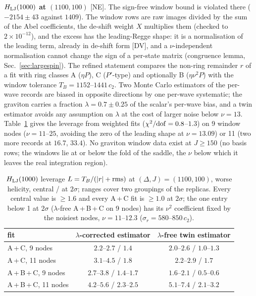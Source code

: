 \documentclass[aps,prl,onecolumn,superscriptaddress,nofootinbib]{revtex4-2}
\begin{document}
\textbf{$H_{\rm LJ}(1000)$ at $(1100,100)$} [NE]. The sign-free window bound is violated there ($-2154\pm43$ against
$1409$). The window rows are raw images divided by the sum of the Abel coefficients, the de-shift weight $X$
multiplies them (checked to $2\times10^{-12}$), and the excess has the leading-Regge shape: it is a normalisation of
the leading term, already in de-shift form [DV], and a $\nu$-independent normalisation cannot change the sign of a
per-state matrix (congruence lemma, Sec.~\ref{sec:largespin}). The refined statement compares the non-ring
remainder $r$ of a fit with ring classes A ($\eta P$), C ($P'$-type) and optionally B ($\eta\nu^2P$) with the window
tolerance $T_B=1152$--$1441\,c_2$. Two Monte Carlo estimators of the per-wave records are biased in
opposite directions by one per-wave systematic; the graviton carries a fraction $\lambda=0.7\pm0.25$ of the scalar's
per-wave bias, and a twin estimator avoids any assumption on $\lambda$ at the cost of larger noise below $\nu=13$.
Table~\ref{tab:dircv} gives the leverage from weighted fits ($\chi^2/{\rm dof}=0.8$--$1.3$) on 9 window nodes
($\nu=11$--$25$, avoiding the zero of the leading shape at $\nu=13.09$) or 11 (two more records at $16.7$, $33.4$).
No graviton window data exist at $J\ge150$ (no basis rows; the windows lie at or below the fold of the saddle, the $\nu$ below which it leaves the real integration region).

\begin{table}[!htbp]
\caption{\label{tab:dircv}$H_{\rm LJ}(1000)$ leverage $L=T_B/(|r|+{\rm rms})$ at $(\Delta,J)=(1100,100)$, worse helicity,
central / at $2\sigma$; ranges cover two groupings of the replicas. Every central value is $\ge1.6$ and every
A\,+\,C fit is $\ge1.0$ at $2\sigma$; the one entry below 1 at $2\sigma$ ($\lambda$-free A\,+\,B\,+\,C on 9 nodes) has its
$\nu^2$ coefficient fixed by the noisiest nodes, $\nu=11$--$12.3$ ($\sigma_r=580$--$850\,c_2$).}
\footnotesize
\begin{ruledtabular}
\begin{tabular}{lcc}
fit & $\lambda$-corrected estimator & $\lambda$-free twin estimator\\\hline
A\,+\,C, 9 nodes & $2.2$--$2.7$ / $1.4$ & $2.0$--$2.6$ / $1.0$--$1.3$\\
A\,+\,C, 11 nodes & $3.1$--$4.5$ / $1.8$ & $2.2$--$2.9$ / $1.7$\\
A\,+\,B\,+\,C, 9 nodes & $2.7$--$3.8$ / $1.4$--$1.7$ & $1.6$--$2.1$ / $0.5$--$0.6$\\
A\,+\,B\,+\,C, 11 nodes & $4.2$--$5.6$ / $2.3$--$2.5$ & $5.1$--$7.4$ / $2.1$--$3.2$\\
\end{tabular}
\end{ruledtabular}
\end{table}
\end{document}
